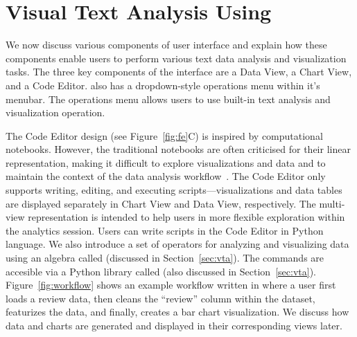 \section{Visual Text Analysis Using \system}
\label{sec:system}
We now discuss various components of \system user interface and explain how these components enable users to perform various text data analysis and visualization tasks. The three key components of the interface are a Data View, a Chart View, and a Code Editor. \system also has a dropdown-style operations menu within it's menubar.
The operations menu allows users to use built-in text analysis and visualization operation. 

The Code Editor design (see Figure~\ref{fig:fe}C) is inspired by computational notebooks. 
However, the traditional notebooks are often criticised for their linear representation, making it difficult to explore visualizations and data and to maintain the context of the data analysis workflow~\cite{?}. The \system Code Editor only supports writing, editing, and executing scripts---visualizations and data tables are displayed separately in Chart View and Data View, respectively. The multi-view representation is intended to help users in more flexible exploration within the analytics session. Users can write scripts in the Code Editor in Python language. We also introduce a set of operators for analyzing and visualizing data using an algebra called \vta (discussed in Section~\ref{sec:vta}). The \vta commands are accesible via a Python library called \vital (also discussed in Section~\ref{sec:vta}).
Figure~\ref{fig:workflow} shows an example workflow written in \vital where a user first loads a review data, then cleans the ``review'' column within the dataset, featurizes the data, and finally, creates a bar chart visualization. We discuss how data and charts are generated and displayed in their corresponding views later.

